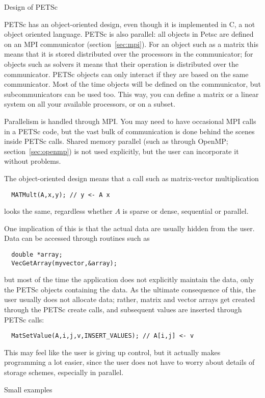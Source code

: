  {Design of PETSc}

PETSc has an object-oriented design, even though it is implemented in
C, a not object oriented language. PETSc is also parallel: all objects
in Petsc are defined on an MPI communicator
(section~\ref{sec:mpi}). For an object such as a matrix this means
that it is stored distributed over the processors in the communicator;
for objects such as solvers it means that their operation is
distributed over the communicator.  PETSc objects can only interact if
they are based on the same communicator.  Most of the time objects
will be defined on the  communicator, but
subcommunicators can be used too. This way, you can define a matrix or
a linear system on all your available processors, or on a subset.

Parallelism is handled through MPI. You may need to have occasional
MPI calls in a PETSc code, but the vast bulk of communication is done
behind the scenes inside PETSc calls. Shared memory parallel (such as
through OpenMP; section~\ref{sec:openmp}) is not used explicitly, but
the user can incorporate it without problems.

The object-oriented design means that a call such as matrix-vector
multiplication
\begin{verbatim}
  MATMult(A,x,y); // y <- A x
\end{verbatim}
looks the same, regardless whether $A$ is sparse or dense, sequential
or parallel.

One implication of this is that the actual data are usually hidden from
the user. Data can be accessed through routines such as
\begin{verbatim}
  double *array;
  VecGetArray(myvector,&array); 
\end{verbatim}
but most of the time the application does not explicitly maintain the
data, only the PETSc objects containing the data. As the ultimate consequence
of this, the user usually does not allocate data; rather, matrix and vector
arrays get created through the PETSc create calls, and subsequent
values are inserted through PETSc calls:
\begin{verbatim}
  MatSetValue(A,i,j,v,INSERT_VALUES); // A[i,j] <- v
\end{verbatim}
This may feel like the user is giving up control, but it actually
makes programming a lot easier, since the user does not have to worry
about details of storage schemes, especially in parallel.

 {Small examples}

